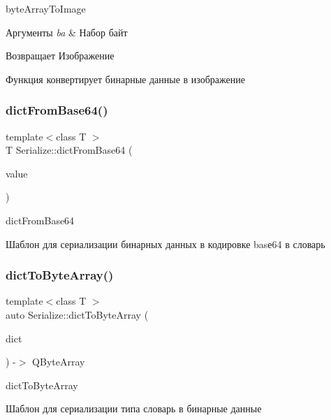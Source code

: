 byte\+Array\+To\+Image 


\begin{DoxyParams}{Аргументы}
{\em ba} & Набор байт \\
\hline
\end{DoxyParams}
\begin{DoxyReturn}{Возвращает}
Изображение
\end{DoxyReturn}
Функция конвертирует бинарные данные в изображение \mbox{\label{namespaceSerialize_ac2bf64c91d863df6a6c6149c7a482af0}} 
\subsubsection{\texorpdfstring{dict\+From\+Base64()}{dictFromBase64()}}
{\footnotesize\ttfamily template$<$class T $>$ \\
T Serialize\+::dict\+From\+Base64 (\begin{DoxyParamCaption}\item[{const Q\+Json\+Value \&}]{value }\end{DoxyParamCaption})}



dict\+From\+Base64 

Шаблон для сериализации бинарных данных в кодировке basе64 в словарь \mbox{\label{namespaceSerialize_a5318048e43f2cacc610f177d093283f8}} 
\subsubsection{\texorpdfstring{dict\+To\+Byte\+Array()}{dictToByteArray()}}
{\footnotesize\ttfamily template$<$class T $>$ \\
auto Serialize\+::dict\+To\+Byte\+Array (\begin{DoxyParamCaption}\item[{const T \&}]{dict }\end{DoxyParamCaption}) -\/$>$ Q\+Byte\+Array}



dict\+To\+Byte\+Array 

Шаблон для сериализации типа словарь в бинарные данные \mbox{\label{namespaceSerialize_a966ed9963741cb19a07f8b057faae920}} 
